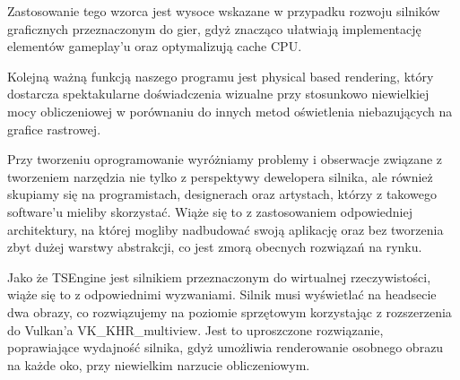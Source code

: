 Zastosowanie tego wzorca jest wysoce wskazane w przypadku rozwoju silników graficznych przeznaczonym do gier, gdyż znacząco ułatwiają implementację elementów gameplay’u oraz optymalizują cache CPU. 

Kolejną ważną funkcją naszego programu jest physical based rendering, który dostarcza spektakularne doświadczenia wizualne przy stosunkowo niewielkiej mocy obliczeniowej w porównaniu do innych metod oświetlenia niebazujących na grafice rastrowej. 

Przy tworzeniu oprogramowanie wyróżniamy problemy i obserwacje związane z tworzeniem narzędzia nie tylko z perspektywy dewelopera silnika, ale również skupiamy się na programistach, designerach oraz artystach, którzy z takowego software’u mieliby skorzystać. Wiąże się to z zastosowaniem odpowiedniej architektury, na której mogliby nadbudować swoją aplikację oraz bez tworzenia zbyt dużej warstwy abstrakcji, co jest zmorą obecnych rozwiązań na rynku. 

Jako że TSEngine jest silnikiem przeznaczonym do wirtualnej rzeczywistości, wiąże się to z odpowiednimi wyzwaniami. Silnik musi wyświetlać na headsecie dwa obrazy, co rozwiązujemy na poziomie sprzętowym korzystając z rozszerzenia do Vulkan’a VK\_KHR\_multiview. Jest to uproszczone rozwiązanie, poprawiające wydajność silnika, gdyż umożliwia renderowanie osobnego obrazu na każde oko, przy niewielkim narzucie obliczeniowym. 